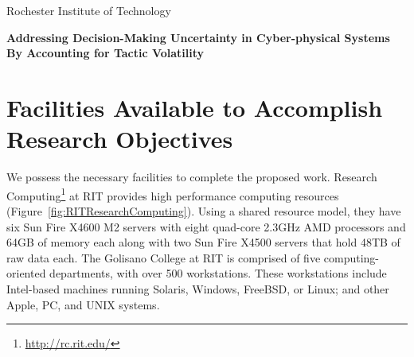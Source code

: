 \documentclass[11pt]{article}
\begin{document}
\renewcommand{\thepage}{Facilities-\arabic{page}}
\setcounter{page}{1}

\def\myskip{3ex}

\centerline{\normalsize Rochester Institute of Technology}
\vspace{4 mm}
\centerline{\normalsize\bf Addressing Decision-Making Uncertainty in Cyber-physical Systems By Accounting for Tactic Volatility}




\section*{Facilities Available to Accomplish Research Objectives}



We possess the necessary facilities to complete the proposed work. Research Computing\footnote{\url{http://rc.rit.edu/}} at RIT provides high performance computing resources (Figure~\ref{fig:RITResearchComputing}). Using a shared resource model, they have six Sun Fire X4600 M2 servers with eight quad-core 2.3GHz AMD processors and 64GB of memory each along with two Sun Fire X4500 servers that hold 48TB of raw data each. The Golisano College at RIT is comprised of five computing-oriented departments, with over 500 workstations. These workstations include Intel-based machines running Solaris, Windows, FreeBSD, or Linux; and other Apple, PC, and UNIX systems.
\end{document}
